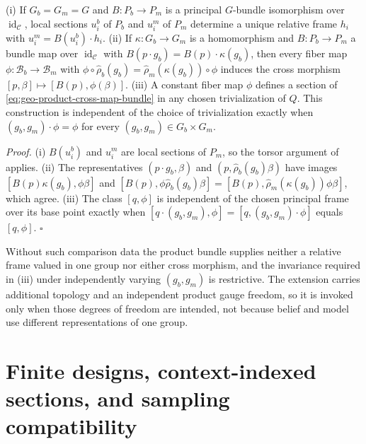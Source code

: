 (i) If \(G_b=G_m=G\) and \(B:P_b\to P_m\) is a principal \(G\)-bundle isomorphism over
\(\operatorname{id}_{\mathcal C}\), local sections \(u_i^b\) of \(P_b\) and \(u_i^m\) of \(P_m\)
determine a unique relative frame \(h_i\) with \(u_i^m=B(u_i^b)\cdot h_i\). (ii) If
\(\kappa:G_b\to G_m\) is a homomorphism and \(B:P_b\to P_m\) a bundle map over
\(\operatorname{id}_{\mathcal C}\) with \(B(p\cdot g_b)=B(p)\cdot\kappa(g_b)\), then every fiber map
\(\phi:\mathcal B_b\to\mathcal B_m\) with
\(\phi\circ\widehat\rho_b(g_b)=\widehat\rho_m(\kappa(g_b))\circ\phi\) induces the cross morphism
\([p,\beta]\mapsto[B(p),\phi(\beta)]\). (iii) A constant fiber map \(\phi\) defines a section of
\eqref{eq:geo-product-cross-map-bundle} in any chosen trivialization of \(Q\). This construction
is independent of the choice of trivialization exactly when
\((g_b,g_m)\cdot\phi=\phi\) for every \((g_b,g_m)\in G_b\times G_m\). 

\noindent\emph{Proof.}
(i) \(B(u_i^b)\) and \(u_i^m\) are local sections of \(P_m\), so the torsor argument of
 applies. (ii) The representatives \((p\cdot g_b,\beta)\) and
\((p,\widehat\rho_b(g_b)\beta)\) have images \([B(p)\kappa(g_b),\phi\beta]\) and
\([B(p),\phi\widehat\rho_b(g_b)\beta]=[B(p),\widehat\rho_m(\kappa(g_b))\phi\beta]\), which agree.
(iii) The class \([q,\phi]\) is independent of the chosen principal frame over its base point exactly when
\([q\cdot(g_b,g_m),\phi]=[q,(g_b,g_m)\cdot\phi]\) equals \([q,\phi]\). \hfill$\square$

Without such comparison data the product bundle supplies neither a relative frame valued in one
group nor either cross morphism, and the invariance required in (iii) under independently varying
\((g_b,g_m)\) is restrictive. The extension carries additional topology and an independent product
gauge freedom, so it is invoked only when those degrees of freedom are intended, not because belief
and model use different representations of one group.

\section{Finite designs, context-indexed sections, and sampling compatibility}
\label{sec:prob-finite-designs}


